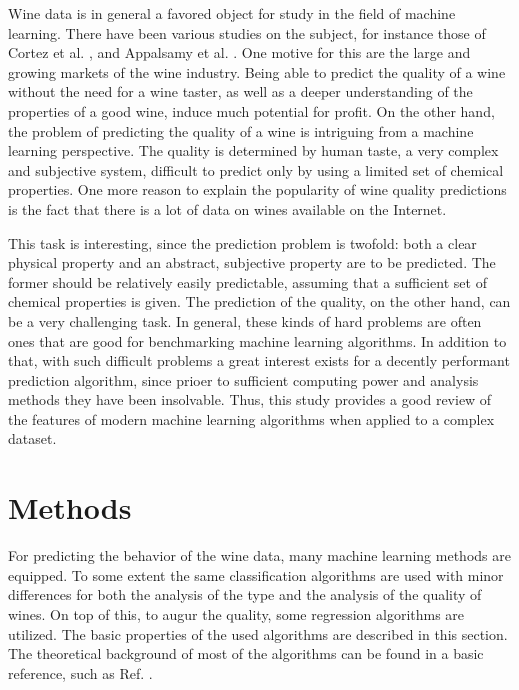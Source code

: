 \documentclass[twoside]{article}
\begin{document}
\begin{multicols}{2}
Wine data is in general a favored object for study in the field of machine learning. There have been various studies
on the subject, for instance those of Cortez et al. \cite{WQA}, \cite{CorCer09} 
and Appalsamy et al. \cite{Appalsami}. One motive for this are the large and growing markets of the wine industry.
Being able to predict the quality of a wine without the need for a wine taster, as well as a deeper understanding
of the properties of a good wine, induce much potential for profit. On the other hand, the problem of predicting
the quality of a wine is intriguing from a machine learning perspective. The quality is determined by human taste,
a very complex and subjective system, difficult to predict only by using a limited set of chemical properties.
One more reason to explain the popularity of wine quality predictions is the fact that there is a lot of data
on wines available on the Internet.

This task is interesting, since the prediction problem is twofold: both a clear physical property and an abstract, subjective property
are to be predicted. The former should be relatively easily predictable, assuming that a sufficient set
of chemical properties is given. The prediction of the quality, on the other hand, can be a very challenging task.
In general, these kinds of hard problems are often ones that are good for benchmarking machine learning algorithms.
In addition to that, with such difficult problems a great interest exists for a decently performant prediction algorithm,
since prioer to sufficient computing power and analysis methods they have been insolvable. Thus, this study provides a
good review of the features of modern machine learning algorithms when applied to a complex dataset.
 
\section{Methods}

For predicting the behavior of the wine data, many machine learning methods are equipped.
To some extent the same classification algorithms are used with minor differences for both
the analysis of the type and the analysis of the quality of wines. On top of this, to augur the 
quality, some regression algorithms are utilized. The basic properties of the used algorithms
are described in this section. The theoretical background of most of the algorithms can be found
in a basic reference, such as Ref. \cite{Alpaydin}. 


\end{multicols}
\end{document}
